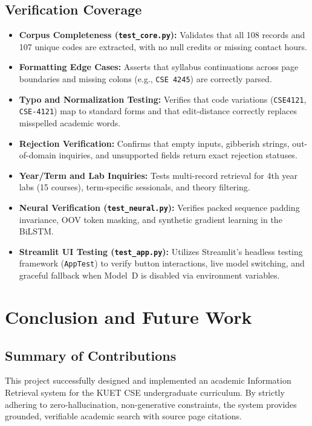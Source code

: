 \documentclass[12pt,a4paper]{report}
\begin{document}
\section{Verification Coverage}
\begin{itemize}
    \item \textbf{Corpus Completeness (\texttt{test\_core.py}):} Validates that all 108 records and 107 unique codes are extracted, with no null credits or missing contact hours.
    \item \textbf{Formatting Edge Cases:} Asserts that syllabus continuations across page boundaries and missing colons (e.g., \texttt{CSE 4245}) are correctly parsed.
    \item \textbf{Typo and Normalization Testing:} Verifies that code variations (\texttt{CSE4121}, \texttt{CSE-4121}) map to standard forms and that edit-distance correctly replaces misspelled academic words.
    \item \textbf{Rejection Verification:} Confirms that empty inputs, gibberish strings, out-of-domain inquiries, and unsupported fields return exact rejection statuses.
    \item \textbf{Year/Term and Lab Inquiries:} Tests multi-record retrieval for 4th year labs (15 courses), term-specific sessionals, and theory filtering.
    \item \textbf{Neural Verification (\texttt{test\_neural.py}):} Verifies packed sequence padding invariance, OOV token masking, and synthetic gradient learning in the BiLSTM.
    \item \textbf{Streamlit UI Testing (\texttt{test\_app.py}):} Utilizes Streamlit's headless testing framework (\texttt{AppTest}) to verify button interactions, live model switching, and graceful fallback when Model~D is disabled via environment variables.
\end{itemize}

\chapter{Conclusion and Future Work}

\section{Summary of Contributions}
This project successfully designed and implemented an academic Information Retrieval system for the KUET CSE undergraduate curriculum. By strictly adhering to zero-hallucination, non-generative constraints, the system provides grounded, verifiable academic search with source page citations.
\end{document}
